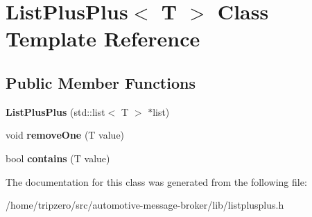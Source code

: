 \hypertarget{classListPlusPlus}{\section{List\-Plus\-Plus$<$ T $>$ Class Template Reference}
\label{classListPlusPlus}
}
\subsection*{Public Member Functions}
\begin{DoxyCompactItemize}
\item 
\hypertarget{classListPlusPlus_a85ba04e9cc171b7d7810000be8563ff2}{{\bfseries List\-Plus\-Plus} (std\-::list$<$ T $>$ $\ast$list)}\label{classListPlusPlus_a85ba04e9cc171b7d7810000be8563ff2}

\item 
\hypertarget{classListPlusPlus_a564faec97930b732d48b76c40312aaaa}{void {\bfseries remove\-One} (T value)}\label{classListPlusPlus_a564faec97930b732d48b76c40312aaaa}

\item 
\hypertarget{classListPlusPlus_a7194ba74fe50501bd31c96ac39c88816}{bool {\bfseries contains} (T value)}\label{classListPlusPlus_a7194ba74fe50501bd31c96ac39c88816}

\end{DoxyCompactItemize}


The documentation for this class was generated from the following file\-:\begin{DoxyCompactItemize}
\item 
/home/tripzero/src/automotive-\/message-\/broker/lib/listplusplus.\-h\end{DoxyCompactItemize}
